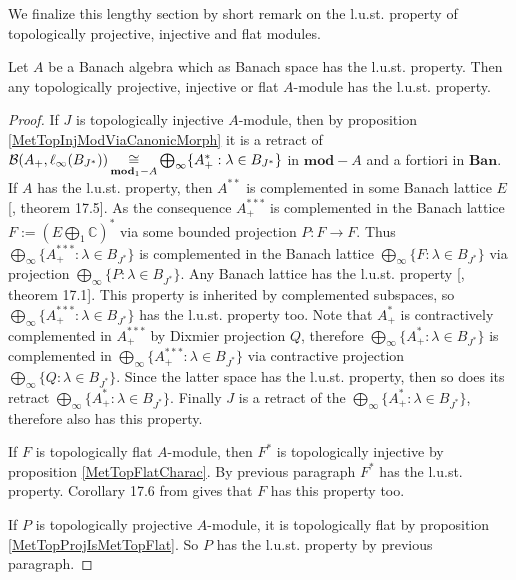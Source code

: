 We finalize this lengthy section by short remark on the l.u.st. property of topologically projective, injective and flat modules. 

\begin{proposition} Let $A$ be a Banach algebra which as Banach space has the l.u.st. property. Then any topologically projective, injective or flat $A$-module has the l.u.st. property.
\end{proposition}
\begin{proof} 

If $J$ is topologically injective $A$-module, then by proposition \ref{MetTopInjModViaCanonicMorph} it is a retract of $\mathcal{B}(A_+,\ell_\infty(B_{J^*}))\mathop{\mathbin{\cong}}\limits_{\mathbf{mod}_1-A}\bigoplus_\infty\{ A_+^*:\lambda\in B_{J^*}\}$ in $\mathbf{mod}-A$ and a fortiori in $\mathbf{Ban}$. If $A$ has the l.u.st. property, then $A^{**}$ is complemented in some Banach lattice $E$ [\cite{DiestAbsSumOps}, theorem 17.5]. As the consequence $A_+^{***}$ is complemented in the Banach lattice $F:=\left(E\bigoplus_1\mathbb{C}\right)^*$ via some bounded projection $P:F\to F$. Thus $\bigoplus_\infty\{A_+^{***}:\lambda\in B_{J^*}\}$ is complemented in the Banach lattice $\bigoplus_\infty\{F:\lambda\in B_{J^*}\}$ via projection $\bigoplus_\infty\{ P:\lambda\in B_{J^*}\}$. Any Banach lattice has the l.u.st. property [\cite{DiestAbsSumOps}, theorem 17.1]. This property is inherited by complemented subspaces, so $\bigoplus_\infty\{A_+^{***}:\lambda\in B_{J^*}\}$ has the l.u.st. property too. Note that $A_+^*$ is contractively complemented in $A_+^{***}$ by Dixmier projection $Q$, therefore $\bigoplus_\infty\{A_+^*:\lambda\in B_{J^*}\}$ is complemented in $\bigoplus_\infty\{A_+^{***}:\lambda\in B_{J^*}\}$ via contractive projection $\bigoplus_\infty\{Q:\lambda\in B_{J^*}\}$. Since the latter space has the l.u.st. property, then so does its retract $\bigoplus_\infty\{A_+^*:\lambda\in B_{J^*}\}$. Finally $J$ is a retract of the $\bigoplus_\infty\{A_+^*:\lambda\in B_{J^*}\}$, therefore also has this property.

If $F$ is topologically flat $A$-module, then $F^*$ is topologically injective by proposition \ref{MetTopFlatCharac}. By previous paragraph $F^*$ has the l.u.st. property. Corollary 17.6 from \cite{DiestAbsSumOps} gives that $F$ has this property too.

If $P$ is topologically projective $A$-module, it is topologically flat by proposition \ref{MetTopProjIsMetTopFlat}. So $P$ has the l.u.st. property by previous paragraph.
\end{proof}

